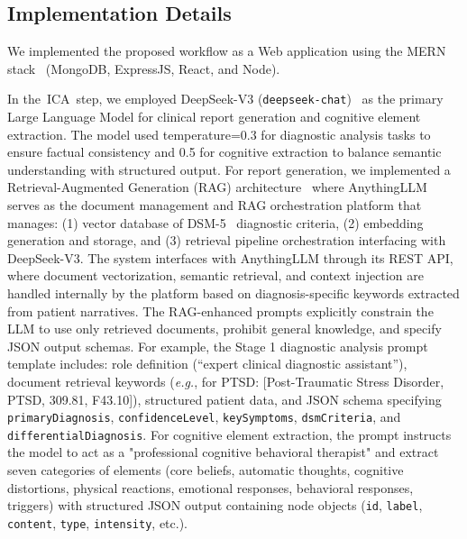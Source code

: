 \documentclass[]{interact}
\newcommand{\eg}{\emph{e.g.}}
\newcommand{\stepas}{ICA}
\begin{document}
\subsection{Implementation Details}
We implemented the proposed workflow as a Web application using the MERN stack~\cite{Koroliova2018MERN} (MongoDB, ExpressJS, React, and Node).

In the~\stepas~step, we employed DeepSeek-V3 (\texttt{deepseek\hspace{0pt}-chat})~\cite{deepseekv3} as the primary Large Language Model for clinical report generation and cognitive element extraction. The model used temperature=0.3 for diagnostic analysis tasks to ensure factual consistency and 0.5 for cognitive extraction to balance semantic understanding with structured output. For report generation, we implemented a Retrieval-Augmented Generation (RAG) architecture~\cite{lewis2020retrieval} where AnythingLLM serves as the document management and RAG orchestration platform that manages: (1) vector database of DSM-5~\cite{DSM5} diagnostic criteria, (2) embedding generation and storage, and (3) retrieval pipeline orchestration interfacing with DeepSeek-V3. The system interfaces with AnythingLLM through its REST API, where document vectorization, semantic retrieval, and context injection are handled internally by the platform based on diagnosis-specific keywords extracted from patient narratives. The RAG-enhanced prompts explicitly constrain the LLM to use only retrieved documents, prohibit general knowledge, and specify JSON output schemas. For example, the Stage 1 diagnostic analysis prompt template includes: role definition (``expert clinical diagnostic assistant''), document retrieval keywords (\eg, for PTSD: [Post-Traumatic Stress Disorder, PTSD, 309.81, F43.10]), structured patient data, and JSON schema specifying \texttt{primary\hspace{0pt}Diagnosis}, \texttt{confidence\hspace{0pt}Level}, \texttt{key\hspace{0pt}Symptoms}, \texttt{dsm\hspace{0pt}Criteria}, and \texttt{differential\hspace{0pt}Diagnosis}. For cognitive element extraction, the prompt instructs the model to act as a "professional cognitive behavioral therapist" and extract seven categories of elements (core beliefs, automatic thoughts, cognitive distortions, physical reactions, emotional responses, behavioral responses, triggers) with structured JSON output containing node objects (\texttt{id}, \texttt{label}, \texttt{content}, \texttt{type}, \texttt{intensity}, etc.).
\end{document}
